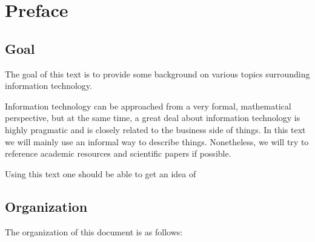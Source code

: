 \chapter*{Preface}\label{chapter:preface}

\section*{Goal}

The goal of this text is to provide some background on various topics surrounding information technology.

Information technology can be approached from a very formal, mathematical perspective, but at the same time, a great deal about information technology is highly pragmatic and is closely related to the business side of things. In this text we will mainly use an informal way to describe things. Nonetheless, we will try to reference academic resources and scientific papers if possible.

Using this text one should be able to get an idea of 


\section*{Organization}

The organization of this document is as follows:

